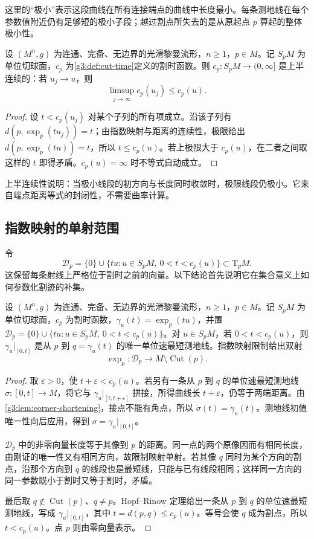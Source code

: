 \ProseParagraphBreak

这里的“极小”表示这段曲线在所有连接端点的曲线中长度最小。每条测地线在每个参数值附近仍有足够短的极小子段；越过割点所失去的是从原起点 \(p\) 算起的整体极小性。

\begin{proposition}\label{g3:prop:cut-time-upper-semicontinuity}
	设 \((M^n,g)\) 为连通、完备、无边界的光滑黎曼流形，\(n\ge1\)，\(p\in M\)。记 \(S_pM\) 为单位切球面，\(c_p\) 为\cref{g3:def:cut-time}定义的割时函数。则 \(c_p:S_pM\to(0,\infty]\) 是上半连续的：若 \(u_j\to u\)，则
	\[
		\limsup_{j\to\infty}c_p(u_j)\le c_p(u).
	\]
\end{proposition}
\begin{proof}
	设 \(t<c_p(u_j)\) 对某个子列的所有项成立。沿该子列有 \(d(p,\exp_p(tu_j))=t\)；由指数映射与距离的连续性，极限给出 \(d(p,\exp_p(tu))=t\)，所以 \(t\le c_p(u)\)。若上极限大于 \(c_p(u)\)，在二者之间取这样的 \(t\) 即得矛盾。\(c_p(u)=\infty\) 时不等式自动成立。
\end{proof}

上半连续性说明：当极小线段的初方向与长度同时收敛时，极限线段仍极小。它来自端点距离等式的封闭性，不需要曲率计算。

\subsection{指数映射的单射范围}
\label{g3:subsec:0204:02}
令
\[
	\mathcal D_p=\{0\}\cup\{tu:u\in S_pM,\ 0<t<c_p(u)\}\subset \mathrm{T}_pM.
\]
这保留每条射线上严格位于割时之前的向量。以下结论首先说明它在集合意义上如何参数化割迹的补集。

\begin{proposition}\label{g3:prop:precut-injectivity}
	设 \((M^n,g)\) 为连通、完备、无边界的光滑黎曼流形，\(n\ge1\)，\(p\in M\)。记 \(S_pM\) 为单位切球面，\(c_p\) 为割时函数，\(\gamma_u(t)=\exp_p(tu)\)，并置 \(\mathcal D_p=\{0\}\cup\{tu:u\in S_pM,\ 0<t<c_p(u)\}\)。对 \(u\in S_pM\)，若 \(0<t<c_p(u)\)，则 \(\gamma_u|_{[0,t]}\) 是从 \(p\) 到 \(q=\gamma_u(t)\) 的唯一单位速最短测地线。指数映射限制给出双射
	\[
		\exp_p:\mathcal D_p\longrightarrow M\setminus\operatorname{Cut}(p).
	\]
\end{proposition}
\begin{proof}
	取 \(\varepsilon>0\)，使 \(t+\varepsilon<c_p(u)\)。若另有一条从 \(p\) 到 \(q\) 的单位速最短测地线 \(\sigma:[0,t]\to M\)，将它与 \(\gamma_u|_{[t,t+\varepsilon]}\) 拼接，所得曲线长 \(t+\varepsilon\)，仍等于两端距离。由\cref{g3:lem:corner-shortening}，接点不能有角点，所以 \(\dot\sigma(t)=\dot\gamma_u(t)\)。测地线初值唯一性向后应用，得到 \(\sigma=\gamma_u|_{[0,t]}\)。

	\(\mathcal D_p\) 中的非零向量长度等于其像到 \(p\) 的距离。同一点的两个原像因而有相同长度，由刚证的唯一性又有相同方向，故限制映射单射。若其像 \(q\) 同时为某个方向的割点，沿那个方向到 \(q\) 的线段也是最短线，只能与已有线段相同；这样同一方向的同一参数既小于割时又等于割时，矛盾。

	最后取 \(q\notin\operatorname{Cut}(p)\)、\(q\ne p\)。Hopf--Rinow 定理给出一条从 \(p\) 到 \(q\) 的单位速最短测地线，写成 \(\gamma_u|_{[0,t]}\)，其中 \(t=d(p,q)\le c_p(u)\)。等号会使 \(q\) 成为割点，所以 \(t<c_p(u)\)。点 \(p\) 则由零向量表示。
\end{proof}

